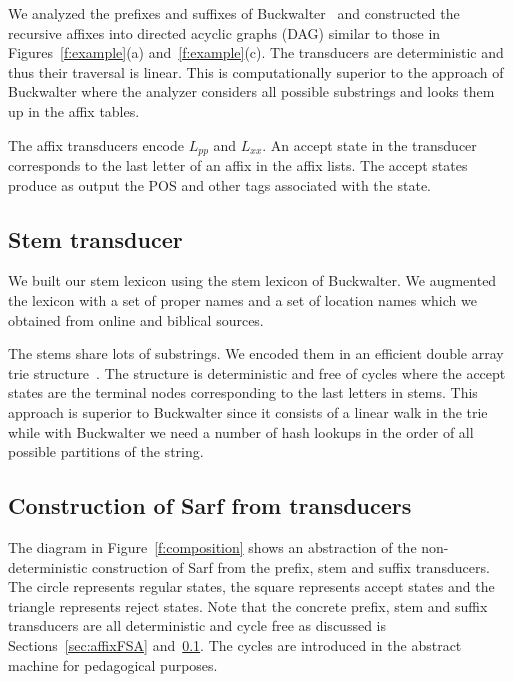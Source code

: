 \documentclass[11pt]{article}
\begin{document}
We analyzed the prefixes and suffixes of 
Buckwalter~
and constructed the recursive affixes
into directed acyclic graphs (DAG) similar to 
those in Figures~\ref{f:example}(a) and~\ref{f:example}(c).
The transducers are deterministic and thus 
their traversal is linear.
This is computationally superior to the 
approach of Buckwalter where the analyzer considers
all possible substrings %
and looks them up in the affix tables. 

The affix transducers encode $L_{pp}$ and
$L_{xx}$.
An accept state in the transducer corresponds to the last letter 
of an affix in the affix lists.
The accept states produce as output the POS and other tags
associated with the state.

\subsection{Stem transducer}
\label{sec:stemFSA}

We built our stem lexicon using the stem lexicon of 
Buckwalter. 
We augmented the lexicon with a set of proper names and
a set of location names which we 
obtained from online and biblical sources. 

The stems share lots of substrings. We encoded them in
an efficient double array trie structure~\cite{Aoe:89}. 
The structure is deterministic and free of cycles where the 
accept states are the terminal nodes corresponding to the last 
letters in stems. 
This approach is superior to Buckwalter since it consists of
a linear walk in the trie while with Buckwalter we need
a number of hash lookups in the order of all possible partitions
of the string.

\subsection{Construction of Sarf from transducers}
\label{sec:ndfsa}

The diagram in Figure~\ref{f:composition} shows an 
abstraction of the non-deterministic construction of Sarf
from the prefix, stem and suffix transducers. 
The circle represents regular states, the square
represents accept states and the triangle represents
reject states. 
Note that the concrete prefix, stem and suffix transducers
are all deterministic and cycle free as discussed 
is Sections~\ref{sec:affixFSA} and~\ref{sec:stemFSA}.
The cycles are introduced in the abstract machine
for pedagogical purposes.
\end{document}
